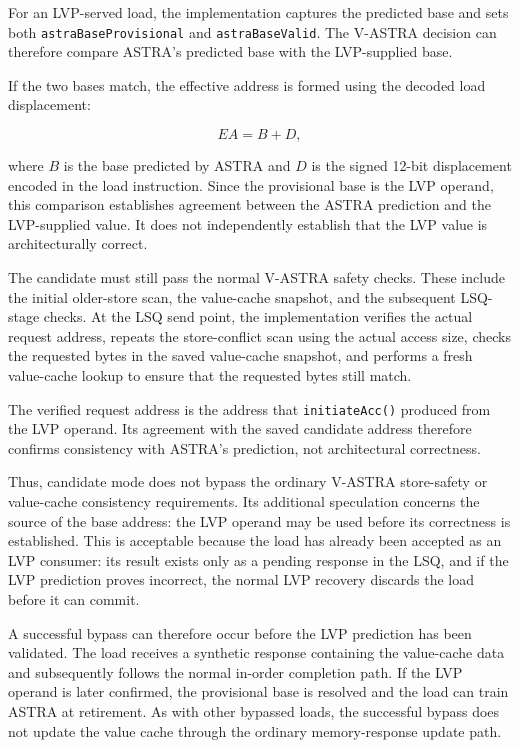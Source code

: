 For an LVP-served load, the implementation captures the
predicted base and sets both
\texttt{astraBase\allowbreak Provisional} and
\texttt{astraBase\allowbreak Valid}. The V-ASTRA decision can therefore
compare ASTRA's predicted base with the LVP-supplied base.

If the two bases match, the effective address is formed using
the decoded load displacement:

\[
    EA = B + D,
\]

where \(B\) is the base predicted by ASTRA and \(D\) is the
signed 12-bit displacement encoded in the load instruction. Since the provisional base is the LVP operand,
this comparison establishes agreement between the ASTRA
prediction and the LVP-supplied value. It does not independently
establish that the LVP value is architecturally correct.

The candidate must still pass the normal V-ASTRA safety checks.
These include the initial older-store scan, the value-cache
snapshot, and the subsequent LSQ-stage checks. At the LSQ send
point, the implementation verifies the actual request address,
repeats the store-conflict scan using the actual access size,
checks the requested bytes in the saved value-cache snapshot,
and performs a fresh value-cache lookup to ensure that the
requested bytes still match.

The verified request address is the address that
\texttt{initiateAcc()} produced from the LVP operand. Its agreement
with the saved candidate address therefore confirms consistency with
ASTRA's prediction, not architectural correctness.

Thus, candidate mode does not bypass the ordinary V-ASTRA
store-safety or value-cache consistency requirements. Its
additional speculation concerns the source of the base address:
the LVP operand may be used before its correctness is established.
This is acceptable because the load has already been accepted as an
LVP consumer: its result exists only as a pending response in the
LSQ, and if the LVP prediction proves incorrect, the
normal LVP recovery discards the load before it can commit.

A successful bypass can therefore occur before the LVP
prediction has been validated. The load receives a synthetic
response containing the value-cache data and subsequently
follows the normal in-order completion path. If the LVP operand
is later confirmed, the provisional base is resolved and the
load can train ASTRA at retirement. As with other bypassed
loads, the successful bypass does not update the value cache
through the ordinary memory-response update path.

